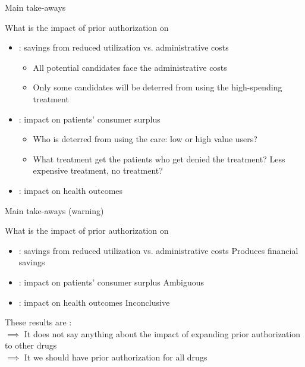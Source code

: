 \begin{frame}{Main take-aways}

    What is the impact of prior authorization on
    \begin{itemize}
        \item {}: savings from reduced utilization vs. administrative costs 
        \begin{itemize}
            \item All potential candidates face the administrative costs
            \item Only some candidates will be deterred from using the high-spending treatment
        \end{itemize}
        \item {}: impact on patients' consumer surplus 
        \begin{itemize}
            \item Who is deterred from using the care: low or high value users?
            \item What treatment get the patients who get denied the treatment? Less expensive treatment, no treatment?
        \end{itemize}
        \item {}: impact on health outcomes 
    \end{itemize}

\end{frame}
\begin{frame}{Main take-aways (warning)}

    What is the impact of prior authorization on
    \begin{itemize}
        \item {}: savings from reduced utilization vs. administrative costs {\color{blue} Produces financial savings}
        \item {}: impact on patients' consumer surplus {\color{blue} Ambiguous}
        \item {}: impact on health outcomes {\color{blue} Inconclusive}
    \end{itemize}
    \vspace{5mm}
    These results are :\\
    $\implies$ It does not say anything about the impact of expanding prior authorization to other drugs\\
    $\implies$ It  we should have prior authorization for all drugs

\end{frame}
